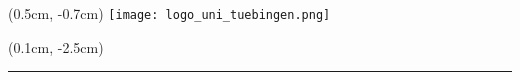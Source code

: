 {
\beamertemplatenavigationsymbolsempty %
\begin{frame}[plain] %
    \begin{textblock*}{0cm}(0.5cm, -0.7cm)
        \texttt{[image: logo\_uni\_tuebingen.png]}
    \end{textblock*}
    \titlepage
    \begin{textblock*}{0cm}(0.1cm, -2.5cm)
        \textcolor{university_tuebingen}{\rule{11.8cm}{0.2cm}}
    \end{textblock*}
\end{frame}
}
